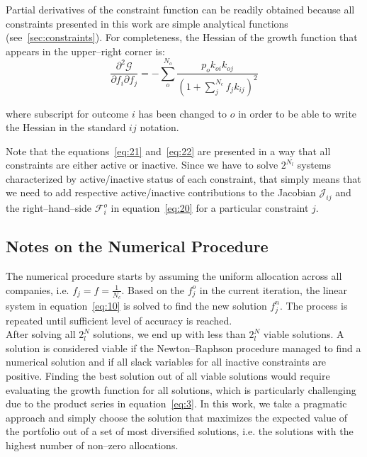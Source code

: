 \documentclass{article}
\begin{document}
\noindent Partial derivatives of the constraint function can be readily obtained
because all constraints presented in this work are simple analytical functions
(see~\autoref{sec:constraints}). For completeness, the Hessian of the growth
function that appears in the upper--right corner is:
\begin{equation}
\label{eq:23}
    \frac{\partial^2 \mathcal{G}}{\partial f_i \partial f_j}
  = 
    - \sum_{o}^{N_o}
      \frac{p_o k_{oi} k_{oj}}{\left(1 + \sum_{j}^{N_c} f_j k_{ij} \right)^2}
\end{equation}

\noindent where subscript for outcome $i$ has been changed to $o$ in order to be
able to write the Hessian in the standard $ij$ notation.

\indent Note that the equations~\eqref{eq:21} and~\eqref{eq:22} are presented in
a way that all constraints are either active or inactive. Since we have to solve
$2^{N_l}$ systems characterized by active/inactive status of each constraint,
that simply means that we need to add respective active/inactive contributions
to the Jacobian $\mathcal{J}_{ij}$ and the right--hand--side $\mathcal{F}_i^o$
in equation~\eqref{eq:20} for a particular constraint $j$.

\subsection{Notes on the Numerical Procedure}
\label{sec:numericalNotes}

\noindent The numerical procedure starts by assuming the uniform allocation
across all companies, i.e. $f_j = f = \frac{1}{N_c}$. Based on the $f_j^o$ in
the current iteration, the linear system in equation~\eqref{eq:10} is solved to
find the new solution $f_j^n$. The process is repeated until sufficient level of
accuracy is reached.\\

\indent After solving all $2^N_l$ solutions, we end up with less than $2^N_l$
viable solutions. A solution is considered viable if the Newton--Raphson
procedure managed to find a numerical solution and if all slack variables
for all inactive constraints are positive. Finding the best solution out of all
viable solutions would require evaluating the growth function for all
solutions, which is particularly challenging due to the product series
in equation~\eqref{eq:3}. In this work, we take a pragmatic approach and
simply choose the solution that maximizes the expected value of the portfolio
out of a set of most diversified solutions, i.e. the solutions with the highest
number of non--zero allocations.
\end{document}
